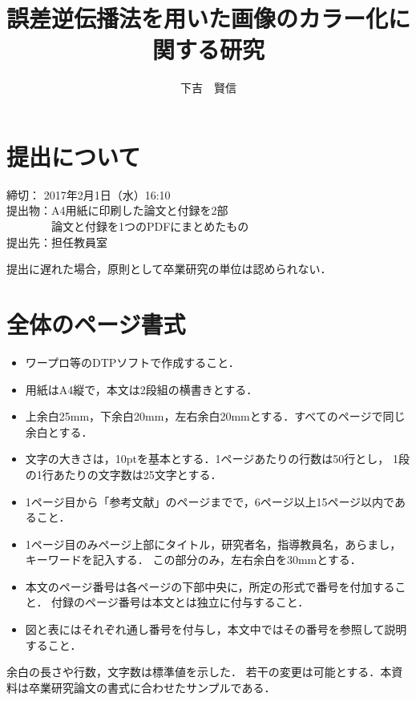 \documentclass[twocolumn,fleqn]{jsarticle}
\begin{document}
\title{誤差逆伝播法を用いた画像のカラー化に関する研究}
\author{下吉　賢信}
\maketitle 

\section{提出について}
\noindent{}締切： {\headfont 2017年2月1日（水）16:10}\\
提出物：A4用紙に印刷した論文と付録を2部\\
　　　　論文と付録を1つのPDFにまとめたもの\\
提出先：担任教員室

提出に遅れた場合，原則として卒業研究の単位は認められない．

\section{全体のページ書式}
\begin{itemize}
\item ワープロ等のDTPソフトで作成すること．
\item 用紙はA4縦で，本文は2段組の横書きとする．
\item 上余白25mm，下余白20mm，左右余白20mmとする．すべてのページで同じ余白とする．
\item 文字の大きさは，10ptを基本とする．1ページあたりの行数は50行とし，
1段の1行あたりの文字数は25文字とする．
\item 1ページ目から「参考文献」のページまでで，6ページ以上15ページ以内であること．
\item 1ページ目のみページ上部にタイトル，研究者名，指導教員名，あらまし，キーワードを記入する．
この部分のみ，左右余白を30mmとする．
\item 本文のページ番号は各ページの下部中央に，所定の形式で番号を付加すること．
付録のページ番号は本文とは独立に付与すること．
\item 図と表にはそれぞれ通し番号を付与し，本文中ではその番号を参照して説明すること．
\end{itemize}

余白の長さや行数，文字数は標準値を示した．
若干の変更は可能とする．本資料は卒業研究論文の書式に合わせたサンプルである．
\end{document}

